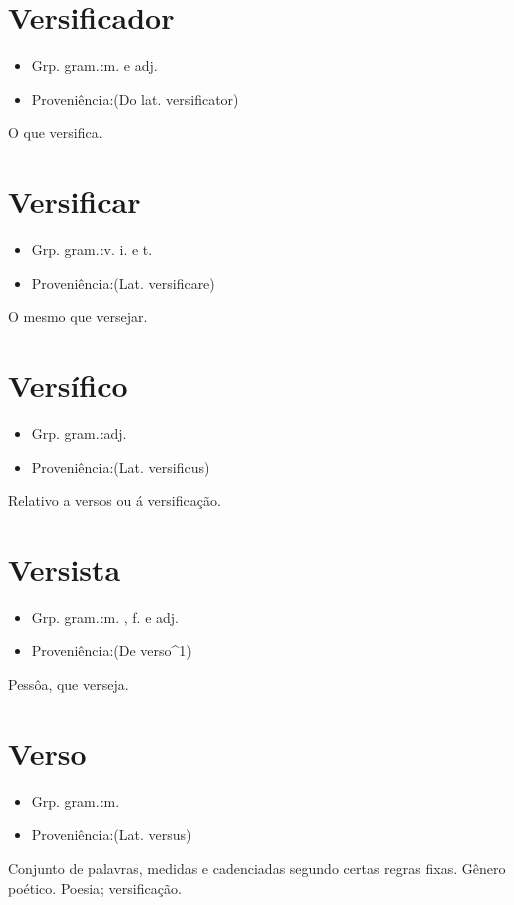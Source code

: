 \documentclass{article}
\begin{document}
\section{Versificador}
\begin{itemize}
\item {Grp. gram.:m.  e  adj.}
\end{itemize}
\begin{itemize}
\item {Proveniência:(Do lat. \textunderscore versificator\textunderscore )}
\end{itemize}
O que versifica.
\section{Versificar}
\begin{itemize}
\item {Grp. gram.:v. i.  e  t.}
\end{itemize}
\begin{itemize}
\item {Proveniência:(Lat. \textunderscore versificare\textunderscore )}
\end{itemize}
O mesmo que \textunderscore versejar\textunderscore .
\section{Versífico}
\begin{itemize}
\item {Grp. gram.:adj.}
\end{itemize}
\begin{itemize}
\item {Proveniência:(Lat. \textunderscore versificus\textunderscore )}
\end{itemize}
Relativo a versos ou á versificação.
\section{Versista}
\begin{itemize}
\item {Grp. gram.:m. ,  f.  e  adj.}
\end{itemize}
\begin{itemize}
\item {Proveniência:(De \textunderscore verso\textunderscore ^1)}
\end{itemize}
Pessôa, que verseja.
\section{Verso}
\begin{itemize}
\item {Grp. gram.:m.}
\end{itemize}
\begin{itemize}
\item {Proveniência:(Lat. \textunderscore versus\textunderscore )}
\end{itemize}
Conjunto de palavras, medidas e cadenciadas segundo certas regras fixas.
Gênero poético.
Poesia; versificação.
\end{document}
